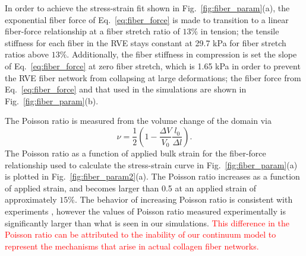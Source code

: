 \documentclass[10pt]{asme2ej}
\begin{document}
In order to achieve the stress-strain fit shown in Fig.\ \ref{fig:fiber_param}(a), the exponential fiber force of Eq.\ \eqref{eq:fiber_force} is made to transition to a linear fiber-force relationship at a fiber stretch ratio of $13\%$ in tension;  the tensile stiffness for each fiber in the RVE stays constant at 29.7 kPa for fiber stretch ratios above $13\%$. Additionally, the fiber stiffness in compression is set the slope of Eq.\ \eqref{eq:fiber_force} at zero fiber stretch, which is 1.65 kPa in order to prevent the RVE fiber network from collapsing at large deformations; the fiber force from Eq.\ \eqref{eq:fiber_force} and that used in the simulations are shown in Fig.\ \ref{fig:fiber_param}(b).

The Poisson ratio is measured from the volume change of the domain via
%
\begin{equation}
\nu = \frac{1}{2}\left(1- \frac{\Delta V}{V_0}\frac{l_0}{\Delta l}\right).
\label{eq:poisson-ratio}
\end{equation}
%
The Poisson ratio as a function of applied bulk strain for the fiber-force relationship used to calculate the stress-strain curve in Fig.\ \ref{fig:fiber_param}(a) is plotted in Fig.\ \ref{fig:fiber_param2}(a). The Poisson ratio increases as a function of applied strain, and becomes larger than 0.5 at an applied strain of approximately $15\%$. The behavior of increasing Poisson ratio is consistent with experiments \cite{Vader:2009js}, however the values of Poisson ratio measured experimentally is significantly larger than what is seen in our simulations. \textcolor{red}{This difference in the Poisson ratio can be attributed to the inability of our continuum model to represent the mechanisms that arise in actual collagen fiber networks.}
%
\end{document}
